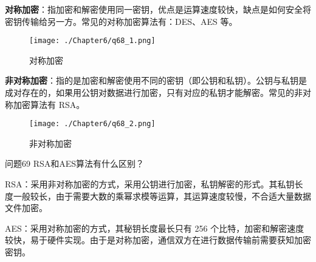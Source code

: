 \documentclass[cn,11pt,color=blue,lang=cn]{elegantbook}
\begin{document}
\begin{solution}

\textbf{对称加密}：指加密和解密使用同一密钥，优点是运算速度较快，缺点是如何安全将密钥传输给另一方。常见的对称加密算法有：DES、AES 等。
\begin{figure}[!h]
\centering
\texttt{[image: ./Chapter6/q68\_1.png]}
\caption{对称加密}
\label{fig68_1}
\end{figure}

\textbf{非对称加密}：指的是加密和解密使用不同的密钥（即公钥和私钥）。公钥与私钥是成对存在的，如果用公钥对数据进行加密，只有对应的私钥才能解密。常见的非对称加密算法有 RSA。
\begin{figure}[!h]
\centering
\texttt{[image: ./Chapter6/q68\_2.png]}
\caption{非对称加密}
\label{fig68_2}
\end{figure}

\end{solution}


\begin{custom}{问题69}
RSA和AES算法有什么区别？
\end{custom}

\begin{solution}
RSA：采用非对称加密的方式，采用公钥进行加密，私钥解密的形式。其私钥长度一般较长，由于需要大数的乘幂求模等运算，其运算速度较慢，不合适大量数据文件加密。

AES：采用对称加密的方式，其秘钥长度最长只有 256 个比特，加密和解密速度较快，易于硬件实现。由于是对称加密，通信双方在进行数据传输前需要获知加密密钥。
\end{solution}
\end{document}
